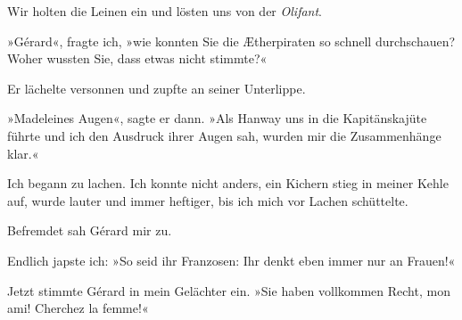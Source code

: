 Wir holten die Leinen ein und lösten uns von der \emph{Olifant}.

»Gérard«, fragte ich, »wie konnten Sie die Ætherpiraten so schnell
durchschauen? Woher wussten Sie, dass etwas nicht stimmte?«

Er lächelte versonnen und zupfte an seiner Unterlippe.

»Madeleines Augen«, sagte er dann. »Als Hanway uns in die
Kapitänskajüte führte und ich den Ausdruck ihrer Augen sah, wurden
mir die Zusammenhänge klar.«

Ich begann zu lachen. Ich konnte nicht anders, ein Kichern stieg in
meiner Kehle auf, wurde lauter und immer heftiger, bis ich mich vor
Lachen schüttelte.

Befremdet sah Gérard mir zu.

Endlich japste ich: »So seid ihr Franzosen: Ihr denkt eben immer
nur an Frauen!«

Jetzt stimmte Gérard in mein Gelächter ein. »Sie haben vollkommen
Recht, mon ami! Cherchez la femme!«



